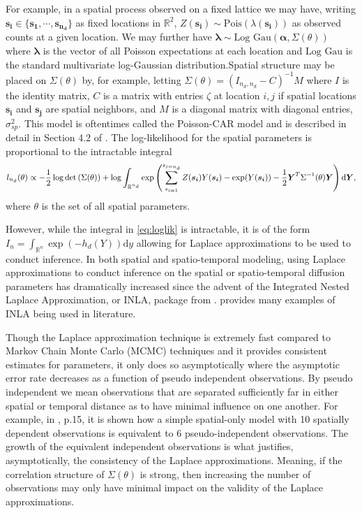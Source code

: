 \documentclass[11pt]{isuthesis}
\begin{document}
	For example, in a spatial process observed on a fixed lattice we may have, writing $\boldsymbol{s_i} \in \{\boldsymbol{s_1},\cdots,\boldsymbol{s_{n_d}}\}$ as fixed locations in $\mathbb{R}^2$, $Z(\boldsymbol{s_i})\sim \mbox{Pois}(\lambda(\boldsymbol{s_i}))$ as observed counts at a given location.  We may further have $\boldsymbol{\lambda} \sim \mbox{Log Gau} (\boldsymbol{\alpha}, \Sigma(\theta))$ where $\boldsymbol{\lambda}$ is the vector of all Poisson expectations at each location and $\mbox{Log Gau}$ is the standard multivariate log-Gaussian distribution.Spatial structure may be placed on $\Sigma(\theta)$ by, for example, letting $\Sigma(\theta) = (I_{n_d,n_d}-C)^{-1}M$ where $I$ is the identity matrix, $C$ is a matrix with entries   $\zeta$ at location $i,j$ if spatial locations $\boldsymbol{s_i}$ and $\boldsymbol{s_j}$ are spatial neighbors, and $M$ is a diagonal matrix with diagonal entries, $\sigma_{sp}^2$.  This model is oftentimes called the Poisson-CAR model and is described in detail in Section 4.2 of \cite{cressie2015statistics}.  The log-likelihood for the spatial parameters is proportional to the intractable integral
	\begin{equation}
	\small l_{n_d}(\theta) \propto -\frac{1}{2}\log \det \left(\Sigma (\theta)\right) + \log \int_{\mathbb{R}^{n_d}} \exp \left(\sum_{s_{i=1}}^{s_{i={n_d}}} Z(\boldsymbol{s_i})Y(\boldsymbol{s_i})-\exp(Y(\boldsymbol{s_i})) - \frac{1}{2} \boldsymbol{Y}^T \Sigma^{-1}(\theta) \boldsymbol{Y} \right) \text{d} \boldsymbol{Y} \label{eq:loglik},
	\end{equation}
	where $\theta$ is the set of all spatial parameters.
	
	
	However, while the integral in \eqref{eq:loglik} is intractable, it is of the form $I_n = \int_{\mathbb{R}^n} \exp(-h_{d}\left(Y\right)) \text{d}y$ allowing for Laplace approximations to be used to conduct inference.  In both spatial and spatio-temporal modeling, using Laplace approximations to conduct inference on the spatial or spatio-temporal diffusion parameters has dramatically increased since the advent of the Integrated Nested Laplace Approximation, or INLA, package from \cite{rue2009approximate}.  \cite{rue2017bayesian} provides many examples of INLA being used in literature.
	
	Though the Laplace approximation technique is extremely fast compared to Markov Chain Monte Carlo (MCMC) techniques and it provides consistent estimates for parameters, it only does so asymptotically where the asymptotic error rate decreases as a function of pseudo independent observations.  By pseudo independent we mean observations that are separated sufficiently far in either spatial or temporal distance as to have minimal influence on one another.  For example, in \cite{cressie1992statistics}, p.15, it is shown how a simple spatial-only model with 10 spatially dependent observations is equivalent to 6 pseudo-independent observations.  The growth of the equivalent independent observations is what justifies, asymptotically, the consistency of the Laplace approximations.  Meaning, if the correlation structure of $\Sigma(\theta)$ is strong, then increasing the number of observations may only have minimal impact on the validity of the Laplace approximations. 
	
\end{document}
